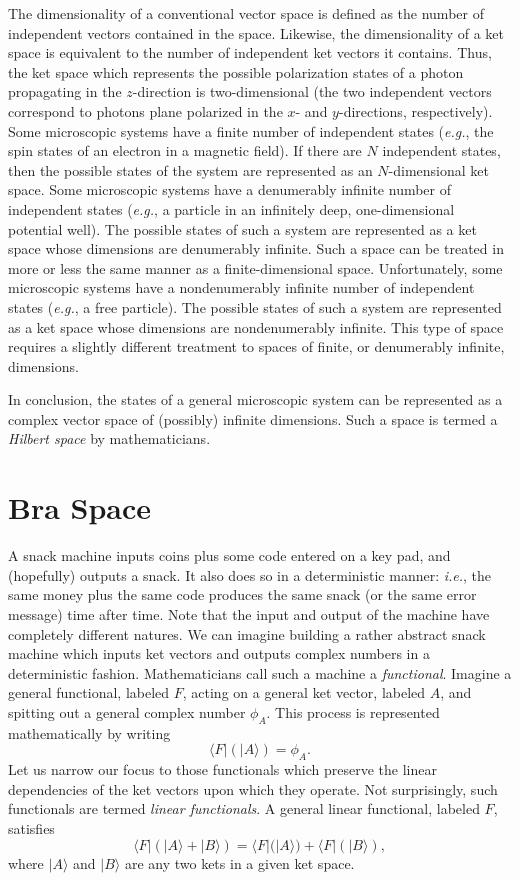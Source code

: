 The dimensionality of a conventional vector space is defined as the number
of independent vectors contained in the space. Likewise, the dimensionality
of a ket space is equivalent to the number of independent ket vectors it contains. 
Thus, the ket space which represents the possible polarization 
states of a photon propagating in the $z$-direction is two-dimensional
(the two independent vectors correspond to photons plane polarized in the
$x$- and $y$-directions, respectively). Some microscopic
systems have a finite number of independent states ({\em e.g.}, the spin states
of an electron in a magnetic field). If there are $N$ independent states,
then the possible states of the 
system are represented as an  $N$-dimensional ket space.  Some microscopic
systems have a denumerably infinite number of independent states ({\em e.g.},
a particle in an infinitely deep, one-dimensional potential well). 
The possible states of such a system are represented as a ket space whose
dimensions are denumerably infinite. Such a space can be treated in more or
less the same manner as a finite-dimensional space. Unfortunately, some
microscopic systems have a nondenumerably infinite number of independent states
({\em e.g.}, a free particle). The possible states  of such a system are represented
as a ket space whose dimensions are nondenumerably infinite. This type of
space requires a slightly different treatment to spaces of finite, or
denumerably infinite, dimensions. 

In conclusion, the  states of a general microscopic system can be  represented
as a complex vector space of (possibly) infinite dimensions. Such a space
is termed a {\em Hilbert space} by mathematicians.

\section{Bra Space}
 A snack machine inputs coins plus some code entered on a key pad, and
(hopefully) outputs a snack. It also does so in a deterministic manner: {\em i.e.},
the same money plus the same code produces the same snack 
(or the same error message) time after time.
Note that the input and output of the machine have completely different natures. 
We can imagine building a rather abstract snack machine which inputs ket
vectors and outputs  complex numbers in a deterministic fashion. Mathematicians
call such a machine a {\em functional}. Imagine a general functional, labeled
$F$, acting on a general ket vector, labeled $A$, and spitting out a general
complex number $\phi_A$. This  process is represented mathematically by writing
\begin{equation}
\langle F|(|A\rangle) = \phi_A.
\end{equation}
Let us narrow our focus to those functionals which preserve the linear dependencies
of the ket vectors upon which they operate. Not surprisingly, such functionals
are termed {\em linear functionals}. A general linear functional, labeled $F$,
satisfies
\begin{equation}\label{e2.10}
\langle F|(|A\rangle + |B\rangle) = \langle F|(|A\rangle) +
 \langle F|(|B \rangle),
\end{equation}
where $|A\rangle$ and $|B\rangle$ are any two kets in a given ket space.

